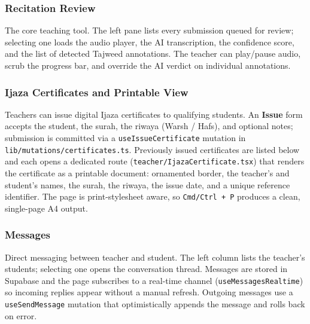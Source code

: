 

\subsubsection{Recitation Review}

The core teaching tool. The left pane lists every submission queued for review; selecting one loads the audio player, the AI transcription, the confidence score, and the list of detected Tajweed annotations. The teacher can play/pause audio, scrub the progress bar, and override the AI verdict on individual annotations.


\subsubsection{Ijaza Certificates and Printable View}

Teachers can issue digital Ijaza certificates to qualifying students. An \textbf{Issue} form accepts the student, the surah, the riwaya (Warsh / Hafs), and optional notes; submission is committed via a \texttt{useIssueCertificate} mutation in \texttt{lib/mutations/certificates.ts}. Previously issued certificates are listed below and each opens a dedicated route (\texttt{teacher/IjazaCertificate.tsx}) that renders the certificate as a printable document: ornamented border, the teacher's and student's names, the surah, the riwaya, the issue date, and a unique reference identifier. The page is print-stylesheet aware, so \texttt{Cmd/Ctrl + P} produces a clean, single-page A4 output.



\subsubsection{Messages}

Direct messaging between teacher and student. The left column lists the teacher's students; selecting one opens the conversation thread. Messages are stored in Supabase and the page subscribes to a real-time channel (\texttt{useMessagesRealtime}) so incoming replies appear without a manual refresh. Outgoing messages use a \texttt{useSendMessage} mutation that optimistically appends the message and rolls back on error.

